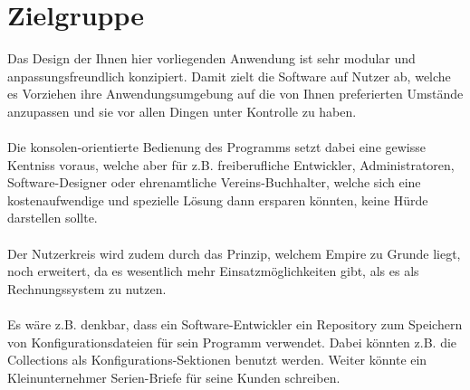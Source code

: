 
\section{Zielgruppe}

Das Design der Ihnen hier vorliegenden Anwendung ist sehr modular und anpassungsfreundlich konzipiert. Damit zielt die Software auf Nutzer ab, welche
es Vorziehen ihre Anwendungsumgebung auf die von Ihnen preferierten Umstände anzupassen und sie vor allen Dingen unter Kontrolle zu haben.
\\\\
Die konsolen-orientierte Bedienung des Programms setzt dabei eine gewisse Kentniss voraus, welche aber für z.B. freiberufliche Entwickler, Administratoren,
Software-Designer oder ehrenamtliche Vereins-Buchhalter, welche sich eine kostenaufwendige und spezielle Lösung dann ersparen könnten, keine Hürde darstellen sollte.
\\\\
Der Nutzerkreis wird zudem durch das Prinzip, welchem Empire zu Grunde liegt, noch erweitert, da es wesentlich mehr Einsatzmöglichkeiten gibt, als es als Rechnungssystem
zu nutzen.
\\\\
Es wäre z.B. denkbar, dass ein Software-Entwickler ein Repository zum Speichern von Konfigurationsdateien für sein Programm verwendet.
Dabei könnten z.B. die Collections als Konfigurations-Sektionen benutzt werden. Weiter könnte ein Kleinunternehmer Serien-Briefe für seine Kunden schreiben.

%
%
